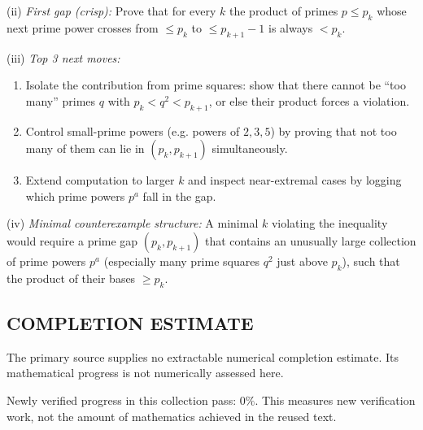 (ii) \emph{First gap (crisp):} Prove that for every $k$ the product of primes $p\le p_k$ whose next prime power crosses from $\le p_k$ to $\le p_{k+1}-1$ is always $<p_k$.

(iii) \emph{Top 3 next moves:}
\begin{enumerate}
\item Isolate the contribution from prime squares: show that there cannot be ``too many'' primes $q$ with $p_k<q^2<p_{k+1}$, or else their product forces a violation.
\item Control small-prime powers (e.g. powers of $2,3,5$) by proving that not too many of them can lie in $(p_k,p_{k+1})$ simultaneously.
\item Extend computation to larger $k$ and inspect near-extremal cases by logging which prime powers $p^a$ fall in the gap.
\end{enumerate}

(iv) \emph{Minimal counterexample structure:} A minimal $k$ violating the inequality would require a prime gap $(p_k,p_{k+1})$ that contains an unusually large collection of prime powers $p^a$ (especially many prime squares $q^2$ just above $p_k$), such that the product of their bases $\ge p_k$.




\subsection*{COMPLETION ESTIMATE}
The primary source supplies no extractable numerical completion estimate. Its mathematical progress is not numerically assessed here.

Newly verified progress in this collection pass: $0\%$. This measures new verification work, not the amount of mathematics achieved in the reused text.
